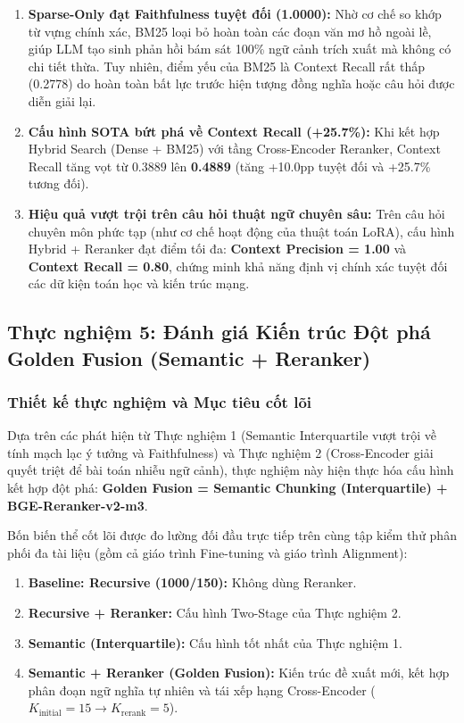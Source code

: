 ﻿\documentclass[12pt]{article}
\begin{document}
\begin{enumerate}
    \item \textbf{Sparse-Only đạt Faithfulness tuyệt đối (1.0000):} Nhờ cơ chế so khớp từ vựng chính xác, BM25 loại bỏ hoàn toàn các đoạn văn mơ hồ ngoài lề, giúp LLM tạo sinh phản hồi bám sát 100\% ngữ cảnh trích xuất mà không có chi tiết thừa. Tuy nhiên, điểm yếu của BM25 là Context Recall rất thấp (0.2778) do hoàn toàn bất lực trước hiện tượng đồng nghĩa hoặc câu hỏi được diễn giải lại.
    \item \textbf{Cấu hình SOTA bứt phá về Context Recall (+25.7\%):} Khi kết hợp Hybrid Search (Dense + BM25) với tầng Cross-Encoder Reranker, Context Recall tăng vọt từ $0.3889$ lên \textbf{0.4889} (tăng +10.0pp tuyệt đối và +25.7\% tương đối).
    \item \textbf{Hiệu quả vượt trội trên câu hỏi thuật ngữ chuyên sâu:} Trên câu hỏi chuyên môn phức tạp (như cơ chế hoạt động của thuật toán LoRA), cấu hình Hybrid + Reranker đạt điểm tối đa: \textbf{Context Precision = 1.00} và \textbf{Context Recall = 0.80}, chứng minh khả năng định vị chính xác tuyệt đối các dữ kiện toán học và kiến trúc mạng.
\end{enumerate}

\subsection{Thực nghiệm 5: Đánh giá Kiến trúc Đột phá Golden Fusion (Semantic + Reranker)}

\subsubsection{Thiết kế thực nghiệm và Mục tiêu cốt lõi}

Dựa trên các phát hiện từ Thực nghiệm 1 (Semantic Interquartile vượt trội về tính mạch lạc ý tưởng và Faithfulness) và Thực nghiệm 2 (Cross-Encoder giải quyết triệt để bài toán nhiễu ngữ cảnh), thực nghiệm này hiện thực hóa cấu hình kết hợp đột phá: \textbf{Golden Fusion = Semantic Chunking (Interquartile) + BGE-Reranker-v2-m3}.

Bốn biến thể cốt lõi được đo lường đối đầu trực tiếp trên cùng tập kiểm thử phân phối đa tài liệu (gồm cả giáo trình Fine-tuning và giáo trình Alignment):
\begin{enumerate}
    \item \textbf{Baseline: Recursive (1000/150):} Không dùng Reranker.
    \item \textbf{Recursive + Reranker:} Cấu hình Two-Stage của Thực nghiệm 2.
    \item \textbf{Semantic (Interquartile):} Cấu hình tốt nhất của Thực nghiệm 1.
    \item \textbf{Semantic + Reranker (Golden Fusion):} Kiến trúc đề xuất mới, kết hợp phân đoạn ngữ nghĩa tự nhiên và tái xếp hạng Cross-Encoder ($K_{\text{initial}} = 15 \to K_{\text{rerank}} = 5$).
\end{enumerate}
\end{document}
